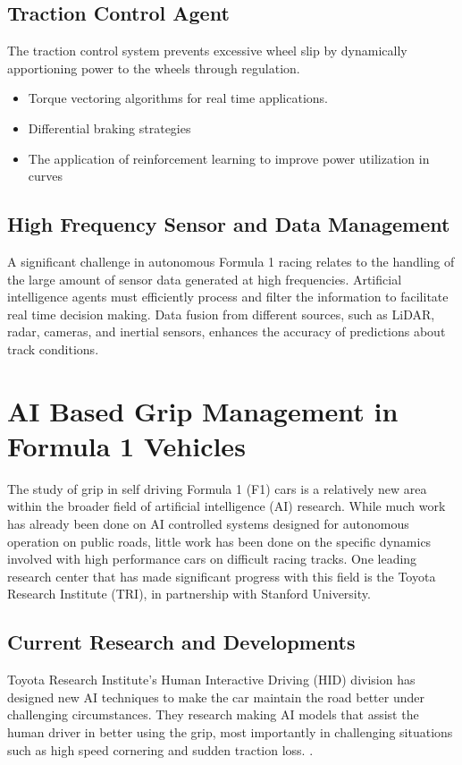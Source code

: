 \documentclass[a4paper,final,12pt]{report}
\begin{document}
\subsection{Traction Control Agent}
The traction control system prevents excessive wheel slip by dynamically apportioning power to the wheels through regulation.
\begin{itemize}
    \item Torque vectoring algorithms for real time applications.
    \item Differential braking strategies
    \item The application of reinforcement learning to improve power utilization in curves 
\end{itemize}

\subsection{High Frequency Sensor and Data Management}
A significant challenge in autonomous Formula 1 racing relates to the handling of the large amount of sensor data generated at high frequencies. Artificial intelligence agents must efficiently process and filter the information to facilitate real time decision making. Data fusion from different sources, such as LiDAR, radar, cameras, and inertial sensors, enhances the accuracy of predictions about track conditions.

\section{AI Based Grip Management in Formula 1 Vehicles}
The study of grip in self driving Formula 1 (F1) cars is a relatively new area within the broader field of artificial intelligence (AI) research. While much work has already been done on AI controlled systems designed for autonomous operation on public roads, little work has been done on the specific dynamics involved with high performance cars on difficult racing tracks. One leading research center that has made significant progress with this field is the Toyota Research Institute (TRI), in partnership with Stanford University.

\subsection{Current Research and Developments}
Toyota Research Institute's Human Interactive Driving (HID) division has designed new AI techniques to make the car maintain the road better under challenging circumstances. They research making AI models that assist the human driver in better using the grip, most importantly in challenging situations such as  high speed cornering and sudden traction loss.
\cite{tri2023}. 
\end{document}
